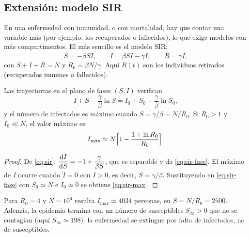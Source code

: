 \subsection{Extensión: modelo SIR}

En una enfermedad con inmunidad, o con mortalidad, hay que contar una variable más (por ejemplo, los recuperados o fallecidos), lo que exige modelos con más compartimentos. El más sencillo es el modelo SIR:
\begin{equation}
  \dot S=-\beta SI,\qquad \dot I=\beta SI-\gamma I,\qquad \dot R=\gamma I,
  \label{eq:sir}
\end{equation}
con $S+I+R=N$ y $R_0=\beta N/\gamma$. Aquí $R(t)$ son los individuos retirados (recuperados inmunes o fallecidos).

\begin{proposition}\label{prop:sir}
Las trayectorias en el plano de fases $(S,I)$ verifican
\begin{equation}
  I + S - \frac{\gamma}{\beta}\ln S = I_0 + S_0 - \frac{\gamma}{\beta}\ln S_0 ,
  \label{eq:sir-fase}
\end{equation}
y el número de infectados es máximo cuando $S=\gamma/\beta=N/R_0$. Si $R_0>1$ y $I_0\ll N$, el valor máximo es
\begin{equation}
  I_{\mathrm{max}}\simeq N\Bigl[1-\frac{1+\ln R_0}{R_0}\Bigr].
  \label{eq:sir-max}
\end{equation}
\end{proposition}

\begin{proof}
De \eqref{eq:sir}, $\dfrac{\mathrm{d} I}{\mathrm{d} S}=-1+\dfrac{\gamma}{\beta S}$, que es separable y da \eqref{eq:sir-fase}. El máximo de $I$ ocurre cuando $\dot I=0$ con $I>0$, es decir, $S=\gamma/\beta$. Sustituyendo en \eqref{eq:sir-fase} con $S_0\simeq N$ e $I_0\simeq 0$ se obtiene \eqref{eq:sir-max}.
\end{proof}

\begin{remark}
Para $R_0=4$ y $N=10^4$ resulta $I_{\mathrm{max}}\simeq 4034$ personas, en $S=N/R_0=2500$. Además, la epidemia termina con un número de susceptibles $S_\infty>0$ que no se contagian (aquí $S_\infty\simeq 198$): la enfermedad se extingue por falta de infectados, no de susceptibles.
\end{remark}

